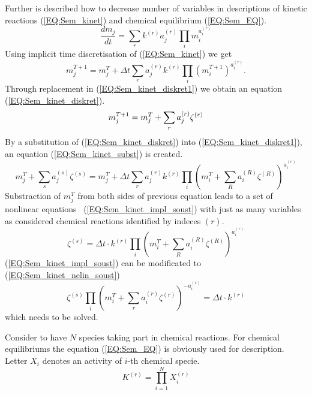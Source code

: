 Further is described how to decrease number of variables in descriptions of kinetic reactions (\ref{EQ:Sem_kinet}) and chemical equilibrium (\ref{EQ:Sem_EQ}).
\begin{equation}
  \label{EQ:Sem_kinet}
  \frac{dm_j}{dt} = \displaystyle\sum\limits_r k^{(r)}a^{(r)}_j\prod_i m_i^{a_i^{(r)}} 
\end{equation}
Using implicit time discretisation of (\ref{EQ:Sem_kinet}) we get
\begin{equation}
  \label{EQ:Sem_kinet_diskret1}
  m_j^{T+1} = m_{j}^{T} + \Delta t \sum_r a_j^{(r)}k^{(r)}\prod_i (m_i^{T + 1})^{a_i^{(r)}}.%
\end{equation}
Through replacement in (\ref{EQ:Sem_kinet_diskret1}) we obtain an equation (\ref{EQ:Sem_kinet_diskret}).
\begin{equation}
  \label{EQ:Sem_kinet_diskret}
  m_j^{T+1} = m_{j}^T + \displaystyle\sum\limits_{r} a_j^{(r)}\zeta^{(r)} \\%
\end{equation}
By a substitution of (\ref{EQ:Sem_kinet_diskret}) into (\ref{EQ:Sem_kinet_diskret1}), an equation (\ref{EQ:Sem_kinet_subst}) is created.
\begin{equation}
  \label{EQ:Sem_kinet_subst}
  m_{j}^{T} + \displaystyle\sum\limits_s a_j^{(s)}\zeta^{(s)} = m_{j}^T + \Delta t \sum_r a_j^{(r)}k^{(r)}\prod_i \left(m_{i}^T + \sum_R a_i^{(R)}\zeta^{(R)}\right)^{a_i^{(r)}}%
\end{equation}
Substraction of $m_j^T$ from both sides of previous equation leads to a set of nonlinear equations ~(\ref{EQ:Sem_kinet_impl_soust}) with just as many variables as considered chemical reactions identified by indeces $(r)$.
\begin{equation}
  \label{EQ:Sem_kinet_impl_soust}
  \zeta^{(s)} = \Delta t \cdot k^{(r)}\displaystyle\prod\limits_i \left(m_{i}^T + \sum_R a_i^{(R)}\zeta^{(R)}\right)^{a_i^{(r)}}
\end{equation}
(\ref{EQ:Sem_kinet_impl_soust}) can be modificated to (\ref{EQ:Sem_kinet_nelin_soust})
\begin{equation}
  \label{EQ:Sem_kinet_nelin_soust} 
  \zeta^{(s)}\displaystyle\prod_i \left(m_{i}^T + \sum_r a_i^{(r)}\zeta^{(r)}\right)^{-a_i^{(r)}} = \Delta t \cdot k^{(r)}
\end{equation}
which needs to be solved.

Consider to have $N$ species taking part in chemical reactions. %
For chemical equilibriums the equation (\ref{EQ:Sem_EQ}) is obviously used for description. Letter $X_i$ denotes an activity of $i$-th chemical specie. 
\begin{equation}
  \label{EQ:Sem_EQ}
  K^{(r)} = \displaystyle\prod\limits_{i = 1}^{N}{X_i^{(r)}}%
\end{equation}